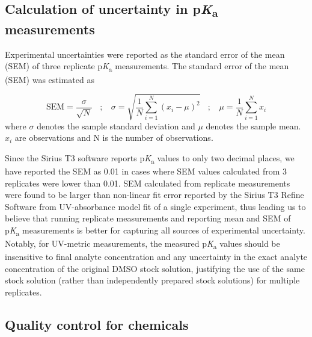 \documentclass[9pt,lineno]{elife}
\newcommand{\pKa}{p\textit{K}\textsubscript{a}}
\begin{document}
\subsection{Calculation of uncertainty in \pKa{} measurements}

Experimental uncertainties were reported as the standard error of the mean (SEM) of three replicate \pKa{} measurements. 
The standard error of the mean (SEM) was estimated as

\begin{equation}
\mathrm{SEM} = \frac{\sigma}{\sqrt{N}}  \:\:\:\:  ;  \:\:\:\: \sigma = \sqrt{\frac{1}{N} \sum_{i=1}^N (x_i - \mu)^2 } \:\:\:\:  ;  \:\:\:\: \mu = \frac{1}{N} \sum_{i=1}^N x_i
\label{eq:sem}
\end{equation}
where $\sigma$ denotes the sample standard deviation and $\mu$ denotes the sample mean. $x_i$ are observations and N is the number of observations. 

Since the Sirius T3 software reports \pKa{} values to only two decimal places, we have reported the SEM as 0.01 in cases where SEM values calculated from 3 replicates were lower than 0.01. 
SEM calculated from replicate measurements were found to be larger than non-linear fit error reported by the Sirius T3 Refine Software from UV-absorbance model fit of a single experiment, thus leading us to believe that running replicate measurements and reporting mean and SEM of \pKa{} measurements is better for capturing all sources of experimental uncertainty.
Notably, for UV-metric measurements, the measured \pKa{} values should be insensitive to final analyte concentration and any uncertainty in the exact analyte concentration of the original DMSO stock solution, justifying the use of the same stock solution (rather than independently prepared stock solutions) for multiple replicates.

\subsection{Quality control for chemicals}
\end{document}
